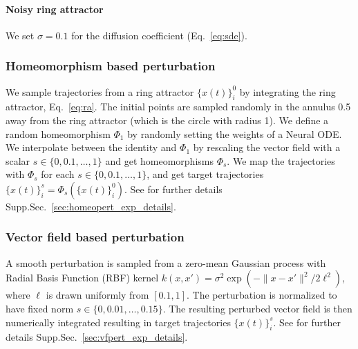 \documentclass{article}
\theoremstyle{definition} \newtheorem{definition}{Definition}  \newtheorem{example}{Example}
\theoremstyle{remark} \newtheorem{remark}{Remark}
\newcounter{ct}
\begin{document}
\paragraph{Noisy ring attractor}
We set $\sigma = 0.1$ for the diffusion coefficient (Eq.~\ref{eq:sde}).


\subsubsection{Homeomorphism based perturbation}\label{sec:homeopert_exp_description}
We sample trajectories from a ring attractor $\{x(t)\}_i^0$ by integrating the ring attractor, Eq.~\ref{eq:ra}.
The initial points are sampled randomly in the annulus 0.5 away from the ring attractor (which is the circle with radius 1).
%
We define a random homeomorphism $\Phi_1$ by randomly setting the weights of a Neural ODE.
%
We interpolate between the identity and $\Phi_1$ by rescaling the vector field with a scalar $s \in \{0, 0.1, \dots, 1\}$ and get homeomorphisms $\Phi_s$.
%
We map the trajectories with $\Phi_s$ for each $s\in \{0, 0.1, \dots, 1\}$, and get target trajectories $\{x(t)\}_i^s = \Phi_s(\{x(t)\}_i^0)$.
%
See for further details  Supp.Sec.~\ref{sec:homeopert_exp_details}.



\subsubsection{Vector field based perturbation}\label{sec:vfpert_exp_description}
 A smooth perturbation is sampled from a zero-mean Gaussian process with Radial Basis Function (RBF) kernel $k(x, x') = \sigma^2 \exp(-\|x - x'\|^2 / 2\ell^2)$, where $\ell$ is drawn uniformly from $[0.1, 1]$.
The perturbation is normalized to have fixed norm $s \in \{0, 0.01, \dots, 0.15\}$.
%
The resulting perturbed vector field is then numerically integrated resulting in target trajectories $\{x(t)\}_i^s$.
%
See for further details  Supp.Sec.~\ref{sec:vfpert_exp_details}.
\end{document}
